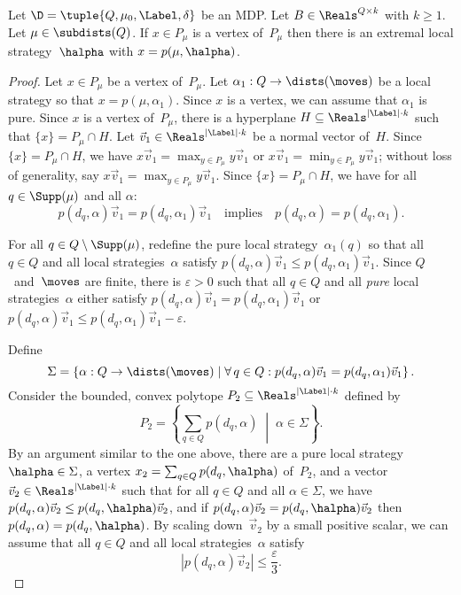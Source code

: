 \begin{lem}\label{lem-vertex-extremal}
Let $\D = \tuple{Q,\mu_{0},\Label,\delta}$ be an MDP\@.
Let $B \in \Reals^{Q \times k}$ with $k \ge 1$.
Let $\mu \in \subdists(Q)$.
If $x \in P_{\mu}$ is a vertex of~$P_{\mu}$ then there is an extremal local strategy~$\halpha$ with $x = p(\mu, \halpha)$.
\end{lem}
\begin{proof}
Let $x \in P_{\mu}$ be a vertex of~$P_{\mu}$.
Let $\alpha_1 : Q \to \dists(\moves)$ be a local strategy so that $x = p(\mu, \alpha_1)$.
Since $x$ is a vertex, we can assume that $\alpha_1$ is pure.
Since $x$ is a vertex of~$P_{\mu}$, there is a hyperplane $H \subseteq \Reals^{{|\Label|} \cdot k}$ such that $\{x\} = P_{\mu} \cap H$.
Let $\vec{v}_1 \in \Reals^{{|\Label|} \cdot k}$ be a normal vector of~$H$.
Since $\{x\} = P_{\mu} \cap H$, we have $x \vec{v}_1 = \max_{y \in P_{\mu}} y \vec{v}_1$ or $x \vec{v}_1 = \min_{y \in P_{\mu}} y \vec{v}_1$; without loss of generality, say $x \vec{v}_1 = \max_{y \in P_{\mu}} y \vec{v}_1$.
Since $\{x\} = P_{\mu} \cap H$, we have for all $q \in \Supp(\mu)$ and all $\alpha$:
\begin{equation} \label{eq-lem-vertex-extremal-suppD}
p(d_q, \alpha) \vec{v}_1 = p(d_q, \alpha_1) \vec{v}_1 \quad \text{implies} \quad p(d_q, \alpha) = p(d_q, \alpha_1).
\end{equation}

For all $q \in Q \setminus \Supp(\mu)$, redefine the pure local strategy~$\alpha_1(q)$ so that all $q \in Q$ and all local strategies~$\alpha$ satisfy $p(d_q, \alpha) \vec{v}_1 \le p(d_q, \alpha_1) \vec{v}_1$.
Since $Q$~and~$\moves$ are finite, there is $\varepsilon > 0$ such that all $q \in Q$ and all \emph{pure} local strategies~$\alpha$  either satisfy $p(d_q, \alpha) \vec{v}_1 = p(d_q, \alpha_1) \vec{v}_1$ or $p(d_q, \alpha) \vec{v}_1 \le p(d_q, \alpha_1) \vec{v}_1 - \varepsilon$.

Define
\[
 \Sigma = \left\{ \alpha : Q \to \dists(\moves) \mid \forall\, q \in Q: p(d_q, \alpha) \vec{v}_1 = p(d_q, \alpha_1) \vec{v}_1 \right\}.
\]
Consider the bounded, convex polytope $P_2 \subseteq \Reals^{{|\Label|} \cdot k}$ defined by
\[
P_2 = \left\{
\sum_{q \in Q} p(d_q, \alpha) \; \middle\vert \;
\alpha \in \Sigma\right\} .
\]
By an argument similar to the one above, there are a pure local strategy $\halpha \in \Sigma$, a vertex $x_2 = \sum_{q \in Q} p(d_q, \halpha)$ of~$P_2$, and a vector $\vec{v}_2 \in \Reals^{{|\Label|} \cdot k}$ such that for all $q \in Q$ and all $\alpha \in \Sigma$, we have $p(d_q, \alpha) \vec{v}_2 \le p(d_q, \halpha) \vec{v}_2$, and if $p(d_q, \alpha) \vec{v}_2 = p(d_q, \halpha) \vec{v}_2$ then $p(d_q, \alpha) = p(d_q, \halpha)$.
By scaling down~$\vec{v}_2$ by a small positive scalar, we can assume that all $q \in Q$ and all local strategies~$\alpha$ satisfy
\begin{equation} \label{eq-small-epsilon}
 \left\lvert p(d_q, \alpha) \vec{v}_2 \right\rvert \le \frac{\varepsilon}{3}.
\end{equation}


\end{proof}
